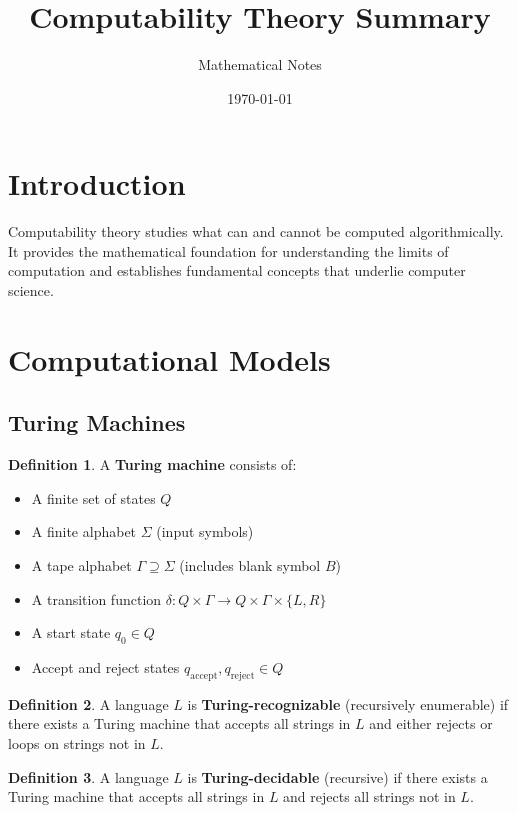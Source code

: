 \documentclass[11pt]{article}
\title{Computability Theory Summary}
\author{Mathematical Notes}
\date{\today}
\theoremstyle{definition}
\newtheorem{definition}{Definition}[section]
\begin{document}
\maketitle

\tableofcontents
\newpage

\section{Introduction}

Computability theory studies what can and cannot be computed algorithmically. It provides the mathematical foundation for understanding the limits of computation and establishes fundamental concepts that underlie computer science.

\section{Computational Models}

\subsection{Turing Machines}
\begin{definition}
A \textbf{Turing machine} consists of:
\begin{itemize}
    \item A finite set of states $Q$
    \item A finite alphabet $\Sigma$ (input symbols)
    \item A tape alphabet $\Gamma \supseteq \Sigma$ (includes blank symbol $B$)
    \item A transition function $\delta: Q \times \Gamma \to Q \times \Gamma \times \{L, R\}$
    \item A start state $q_0 \in Q$
    \item Accept and reject states $q_{\text{accept}}, q_{\text{reject}} \in Q$
\end{itemize}
\end{definition}

\begin{definition}
A language $L$ is \textbf{Turing-recognizable} (recursively enumerable) if there exists a Turing machine that accepts all strings in $L$ and either rejects or loops on strings not in $L$.
\end{definition}

\begin{definition}
A language $L$ is \textbf{Turing-decidable} (recursive) if there exists a Turing machine that accepts all strings in $L$ and rejects all strings not in $L$.
\end{definition}
\end{document}
